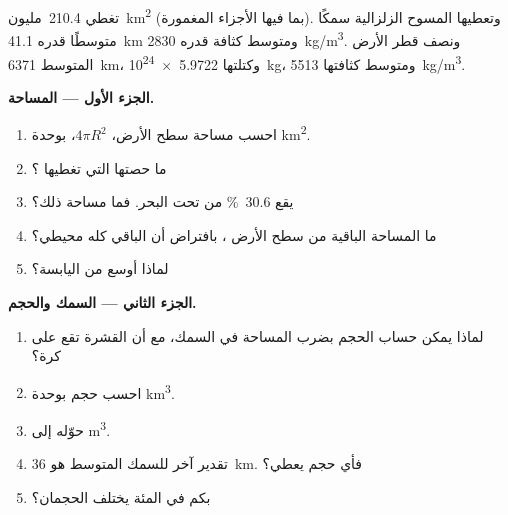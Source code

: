 \begin{problem}
\label{pb:g12:continental-crust:1}
تغطي  \num{210.4}~مليون~\unit{km^2} (بما فيها الأجزاء
المغمورة). وتعطيها المسوح الزلزالية سمكًا متوسطًا قدره \qty{41.1}{km}
ومتوسط كثافة قدره \qty{2830}{kg/m^3}. ونصف قطر الأرض المتوسط
\qty{6371}{km}، وكتلتها \qty{5.9722e24}{kg}، ومتوسط كثافتها
\qty{5513}{kg/m^3}.

\medskip
\noindent\textbf{الجزء الأول --- المساحة.}
\begin{enumerate}
  \item احسب مساحة سطح الأرض، $4\pi R^2$، بوحدة
        \unit{km^2}.
  \item ما حصتها التي تغطيها ؟
  \item يقع \qty{30.6}{\percent} من  تحت البحر.
        فما مساحة ذلك؟
  \item ما المساحة الباقية من سطح الأرض ،
        بافتراض أن الباقي كله محيطي؟
  \item لماذا  أوسع من اليابسة؟
\end{enumerate}

\medskip
\noindent\textbf{الجزء الثاني --- السمك والحجم.}
\begin{enumerate}[resume]
  \item لماذا يمكن حساب الحجم بضرب المساحة في السمك، مع أن
        القشرة تقع على كرة؟
  \item احسب حجم  بوحدة \unit{km^3}.
  \item حوّله إلى \unit{m^3}.
  \item تقدير آخر للسمك المتوسط هو \qty{36}{km}. فأي
        حجم يعطي؟
  \item بكم في المئة يختلف الحجمان؟
\end{enumerate}


\end{problem}
